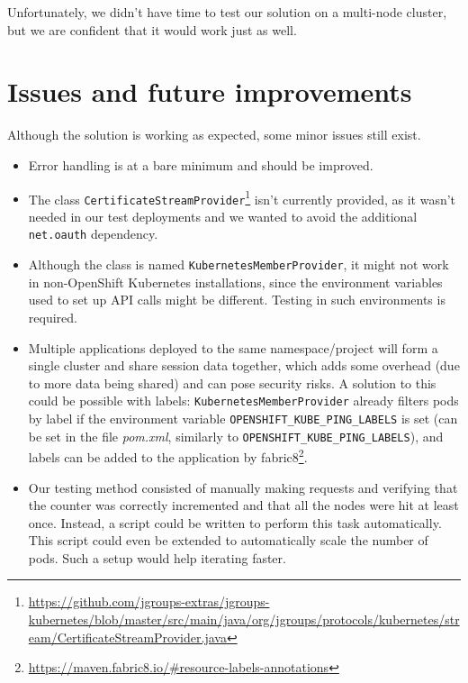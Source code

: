 \documentclass[11pt,a4paper]{article}
\begin{document}
Unfortunately, we didn't have time to test our solution on a multi-node cluster, but we are confident that it would work just as well.


\section{Issues and future improvements}

Although the solution is working as expected, some minor issues still exist.

\begin{itemize}
\item Error handling is at a bare minimum and should be improved.

\item The class \texttt{CertificateStreamProvider}\footnote{\url{https://github.com/jgroups-extras/jgroups-kubernetes/blob/master/src/main/java/org/jgroups/protocols/kubernetes/stream/CertificateStreamProvider.java}} isn't currently provided, as it wasn't needed in our test deployments and we wanted to avoid the additional \texttt{net.oauth} dependency.

\item Although the class is named \texttt{KubernetesMemberProvider}, it might not work in non-OpenShift Kubernetes installations, since the environment variables used to set up API calls might be different. Testing in such environments is required.

\item Multiple applications deployed to the same namespace/project will form a single cluster and share session data together, which adds some overhead (due to more data being shared) and can pose security risks. A solution to this could be possible with labels: \texttt{KubernetesMemberProvider} already filters pods by label if the environment variable \texttt{OPENSHIFT\_KUBE\_PING\_LABELS} is set (can be set in the file \emph{pom.xml}, similarly to \texttt{OPENSHIFT\_KUBE\_PING\_LABELS}), and labels can be added to the application by fabric8\footnote{\url{https://maven.fabric8.io/\#resource-labels-annotations}}.

\item Our testing method consisted of manually making requests and verifying that the counter was correctly incremented and that all the nodes were hit at least once. Instead, a script could be written to perform this task automatically. This script could even be extended to automatically scale the number of pods. Such a setup would help iterating faster.

\end{itemize}
\end{document}
